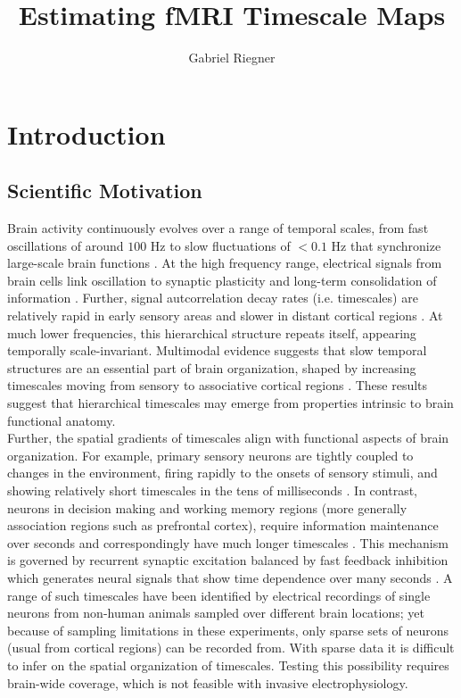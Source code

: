\documentclass[10pt]{article}
\title{Estimating fMRI Timescale Maps}
\author{Gabriel Riegner}
\begin{document}
\maketitle

\section{Introduction}

\subsection{Scientific Motivation} 

Brain activity continuously evolves over a range of temporal scales, from fast oscillations of around $100$ Hz to slow fluctuations of $<0.1$ Hz that synchronize large-scale brain functions \cite{buzsaki_neuronal_2004}. At the high frequency range, electrical signals from brain cells link oscillation to synaptic plasticity and long-term consolidation of information \cite{buzsaki_neuronal_2004}. Further, signal autcorrelation decay rates (i.e. timescales) are relatively rapid in early sensory areas and slower in distant cortical regions \cite{murray_hierarchy_2014, gao_neuronal_2020}. At much lower frequencies, this hierarchical structure repeats itself, appearing temporally scale-invariant. Multimodal evidence suggests that slow temporal structures are an essential part of brain organization, shaped by increasing timescales moving from sensory to associative cortical regions \cite{raut_hierarchical_2020, gao_neuronal_2020, hasson_hierarchy_2008}. These results suggest that hierarchical timescales may emerge from properties intrinsic to brain functional anatomy.\\

Further, the spatial gradients of timescales align with functional aspects of brain organization. For example, primary sensory neurons are tightly coupled to changes in the environment, firing rapidly to the onsets of sensory stimuli, and showing relatively short timescales in the tens of milliseconds \cite{runyan_distinct_2017}. In contrast, neurons in decision making and working memory regions (more generally association regions such as prefrontal cortex), require information maintenance over seconds and correspondingly have much longer timescales \cite{zylberberg_mechanisms_2017}. This mechanism is governed by recurrent synaptic excitation balanced by fast feedback inhibition which generates neural signals that show time dependence over many seconds \cite{wang_decision_2008}. A range of such timescales have been identified by electrical recordings of single neurons from non-human animals sampled over different brain locations; yet because of sampling limitations in these experiments, only sparse sets of neurons (usual from cortical regions) can be recorded from. With sparse data it is difficult to infer on the spatial organization of timescales. Testing this possibility requires brain-wide coverage, which is not feasible with invasive electrophysiology.\\
\end{document}

